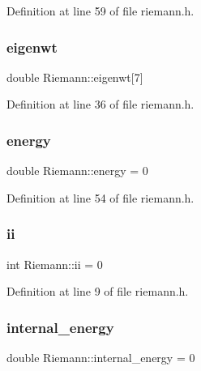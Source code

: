 Definition at line 59 of file riemann.\+h.

\mbox{\label{classRiemann_a195eba0f8d56795aa8749baaba946d20}} 
\subsubsection{\texorpdfstring{eigenwt}{eigenwt}}
{\footnotesize\ttfamily double Riemann\+::eigenwt\mbox{[}7\mbox{]}\hspace{0.3cm}{\ttfamily [private]}}



Definition at line 36 of file riemann.\+h.

\mbox{\label{classRiemann_a970f6cf189521abd99aa533591c3bf91}} 
\subsubsection{\texorpdfstring{energy}{energy}}
{\footnotesize\ttfamily double Riemann\+::energy = 0\hspace{0.3cm}{\ttfamily [private]}}



Definition at line 54 of file riemann.\+h.

\mbox{\label{classRiemann_a2cebab2f34878e07cbf609a6528aea88}} 
\subsubsection{\texorpdfstring{ii}{ii}}
{\footnotesize\ttfamily int Riemann\+::ii = 0\hspace{0.3cm}{\ttfamily [private]}}



Definition at line 9 of file riemann.\+h.

\mbox{\label{classRiemann_a4db4bb758058ec35523e82c67042869d}} 
\subsubsection{\texorpdfstring{internal\+\_\+energy}{internal\_energy}}
{\footnotesize\ttfamily double Riemann\+::internal\+\_\+energy = 0\hspace{0.3cm}{\ttfamily [private]}}



